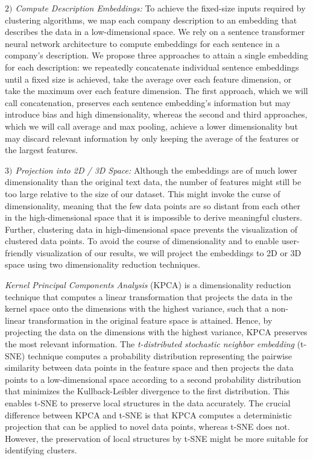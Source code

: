 \documentclass[conference]{IEEEtran}
\begin{document}
\textit{$2)$ Compute Description Embeddings:} To achieve the fixed-size inputs required by clustering algorithms, we map each company description to an embedding that describes the data in a low-dimensional space. We rely on a sentence transformer neural network architecture to compute embeddings for each sentence in a company's description. We propose three approaches to attain a single embedding for each description: we repeatedly concatenate individual sentence embeddings until a fixed size is achieved, take the average over each feature dimension, or take the maximum over each feature dimension. The first approach, which we will call concatenation, preserves each sentence embedding's information but may introduce bias and high dimensionality, whereas the second and third approaches, which we will call average and max pooling, achieve a lower dimensionality but may discard relevant information by only keeping the average of the features or the largest features.

\textit{$3)$ Projection into 2D / 3D Space:} Although the embeddings are of much lower dimensionality than the original text data, the number of features might still be too large relative to the size of our dataset. This might invoke the curse of dimensionality, meaning that the few data points are so distant from each other in the high-dimensional space that it is impossible to derive meaningful clusters. Further, clustering data in high-dimensional space prevents the visualization of clustered data points. To avoid the course of dimensionality and to enable user-friendly visualization of our results, we will project the embeddings to 2D or 3D space using two dimensionality reduction techniques.

\emph{Kernel Principal Components Analysis} (KPCA) is a dimensionality reduction technique that computes a linear transformation that projects the data in the kernel space onto the dimensions with the highest variance, such that a non-linear transformation in the original feature space is attained. Hence, by projecting the data on the dimensions with the highest variance, KPCA preserves the most relevant information.
The \emph{t-distributed stochastic neighbor embedding} (t-SNE) technique computes a probability distribution representing the pairwise similarity between data points in the feature space and then projects the data points to a low-dimensional space according to a second probability distribution that minimizes the Kullback-Leibler divergence to the first distribution. This enables t-SNE to preserve local structures in the data accurately.
The crucial difference between KPCA and t-SNE is that KPCA computes a deterministic projection that can be applied to novel data points, whereas t-SNE does not. However, the preservation of local structures by t-SNE might be more suitable for identifying clusters.
\end{document}
